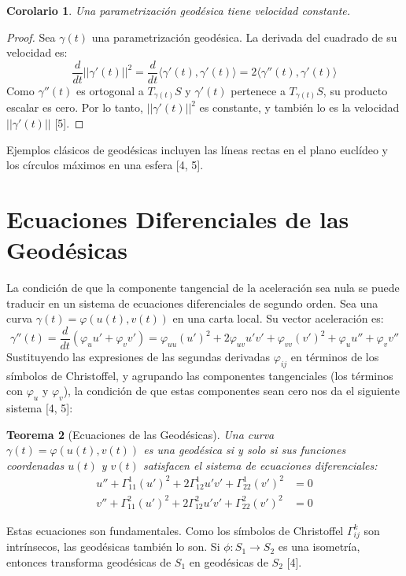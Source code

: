 \documentclass[12pt, a4paper]{report}
\theoremstyle{miestilo}
\newtheorem{teorema}{Teorema}[chapter]
\newtheorem{corolario}[teorema]{Corolario}
\theoremstyle{midefinicion}
\begin{document}
\begin{corolario}
Una parametrización geodésica tiene velocidad constante.
\end{corolario}
\begin{proof}
Sea $\gamma(t)$ una parametrización geodésica. La derivada del cuadrado de su velocidad es:
$$ \frac{d}{dt} ||\gamma'(t)||^2 = \frac{d}{dt} \langle \gamma'(t), \gamma'(t) \rangle = 2 \langle \gamma''(t), \gamma'(t) \rangle $$
Como $\gamma''(t)$ es ortogonal a $T_{\gamma(t)}S$ y $\gamma'(t)$ pertenece a $T_{\gamma(t)}S$, su producto escalar es cero. Por lo tanto, $||\gamma'(t)||^2$ es constante, y también lo es la velocidad $||\gamma'(t)||$ [5].
\end{proof}

Ejemplos clásicos de geodésicas incluyen las líneas rectas en el plano euclídeo y los círculos máximos en una esfera [4, 5].

\section{Ecuaciones Diferenciales de las Geodésicas}

La condición de que la componente tangencial de la aceleración sea nula se puede traducir en un sistema de ecuaciones diferenciales de segundo orden. Sea una curva $\gamma(t) = \varphi(u(t), v(t))$ en una carta local. Su vector aceleración es:
$$ \gamma''(t) = \frac{d}{dt}(\varphi_u u' + \varphi_v v') = \varphi_{uu}(u')^2 + 2\varphi_{uv}u'v' + \varphi_{vv}(v')^2 + \varphi_u u'' + \varphi_v v'' $$
Sustituyendo las expresiones de las segundas derivadas $\varphi_{ij}$ en términos de los símbolos de Christoffel, y agrupando las componentes tangenciales (los términos con $\varphi_u$ y $\varphi_v$), la condición de que estas componentes sean cero nos da el siguiente sistema [4, 5]:

\begin{teorema}[Ecuaciones de las Geodésicas]
Una curva $\gamma(t) = \varphi(u(t), v(t))$ es una geodésica si y solo si sus funciones coordenadas $u(t)$ y $v(t)$ satisfacen el sistema de ecuaciones diferenciales:
\begin{align*}
u'' + \Gamma_{11}^1 (u')^2 + 2\Gamma_{12}^1 u'v' + \Gamma_{22}^1 (v')^2 &= 0 \\
v'' + \Gamma_{11}^2 (u')^2 + 2\Gamma_{12}^2 u'v' + \Gamma_{22}^2 (v')^2 &= 0
\end{align*}
\end{teorema}

Estas ecuaciones son fundamentales. Como los símbolos de Christoffel $\Gamma_{ij}^k$ son intrínsecos, las geodésicas también lo son. Si $\phi: S_1 \to S_2$ es una isometría, entonces transforma geodésicas de $S_1$ en geodésicas de $S_2$ [4].
\end{document}
